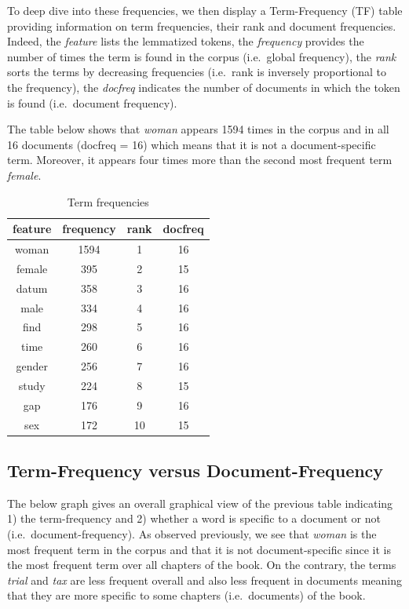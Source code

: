 \documentclass[
]{article}
\begin{document}
To deep dive into these frequencies, we then display a Term-Frequency
(TF) table providing information on term frequencies, their rank and
document frequencies. Indeed, the \emph{feature} lists the lemmatized
tokens, the \emph{frequency} provides the number of times the term is
found in the corpus (i.e.~global frequency), the \emph{rank} sorts the
terms by decreasing frequencies (i.e.~rank is inversely proportional to
the frequency), the \emph{docfreq} indicates the number of documents in
which the token is found (i.e.~document frequency).

The table below shows that \emph{woman} appears 1594 times in the corpus
and in all 16 documents (docfreq = 16) which means that it is not a
document-specific term. Moreover, it appears four times more than the
second most frequent term \emph{female}.

\begin{table}

\caption{\label{tab:term frequency}Term frequencies}
\centering
\begin{tabular}[t]{c|c|c|c}
\hline
feature & frequency & rank & docfreq\\
\hline
woman & 1594 & 1 & 16\\
\hline
female & 395 & 2 & 15\\
\hline
datum & 358 & 3 & 16\\
\hline
male & 334 & 4 & 16\\
\hline
find & 298 & 5 & 16\\
\hline
time & 260 & 6 & 16\\
\hline
gender & 256 & 7 & 16\\
\hline
study & 224 & 8 & 15\\
\hline
gap & 176 & 9 & 16\\
\hline
sex & 172 & 10 & 15\\
\hline
\end{tabular}
\end{table}

\hypertarget{term-frequency-versus-document-frequency}{%
\subsection{Term-Frequency versus
Document-Frequency}\label{term-frequency-versus-document-frequency}}

The below graph gives an overall graphical view of the previous table
indicating 1) the term-frequency and 2) whether a word is specific to a
document or not (i.e.~document-frequency). As observed previously, we
see that \emph{woman} is the most frequent term in the corpus and that
it is not document-specific since it is the most frequent term over all
chapters of the book. On the contrary, the terms \emph{trial} and
\emph{tax} are less frequent overall and also less frequent in documents
meaning that they are more specific to some chapters (i.e.~documents) of
the book.
\end{document}
